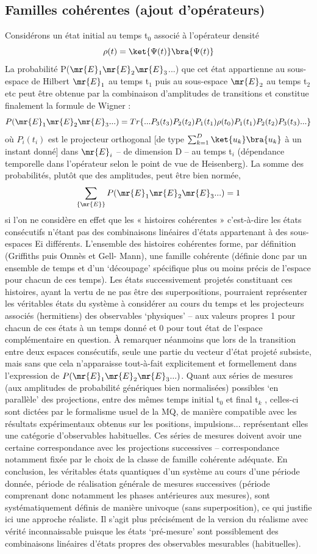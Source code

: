 \subsection{Familles cohérentes (ajout d’opérateurs)}
Considérons un état initial au temps t$_0$ associé à l’opérateur densité
\[
\rho(t)=\ket{\Psi(t)}\bra{\Psi(t)}
\]
La probabilité P($\mr{E}_1\mr{E}_2\mr{E}_3$...) que cet état appartienne au sous-espace de
Hilbert $\mr{E}_1$ au temps t$_1$ puis au sous-espace $\mr{E}_2$ au temps t$_2$ etc peut
être obtenue par la combinaison d’amplitudes de
transitions et constitue finalement la formule de Wigner :
\[
P(\mr{E}_1\mr{E}_2\mr{E}_3...)=
Tr\{...P_3(t_3)P_2(t_2)P_1(t_1)\rho(t_0)P_1(t_1)P_2(t_2)P_3(t_3)...\}
\]
où $P_i(t_i)$ est le projecteur orthogonal [de type $\sum_{k=1}^D\ket{u_k}\bra{u_k}$ à un
 instant donné] dans $\mr{E}_i$ –
de dimension D – au temps t$_i$ (dépendance temporelle dans l’opérateur selon le point de vue
de Heisenberg). La somme des probabilités, plutôt que des amplitudes, peut être bien
normée,
\[
\sum_{\{\mr{E}\}}P(\mr{E}_1\mr{E}_2\mr{E}_3...)=1
\]
si l’on ne considère en effet que les « histoires cohérentes » c’est-à-dire les états consécutifs
n’étant pas des combinaisons linéaires d’états appartenant à des sous-espaces Ei différents.
L’ensemble des histoires cohérentes forme, par définition (Griffiths puis Omnès et Gell-
Mann), une famille cohérente (définie donc par un ensemble de temps et d’un ‘découpage’
spécifique plus ou moins précis de l’espace pour chacun de ces temps). Les états
successivement projetés constituant ces histoires, ayant la vertu de ne pas être des
superpositions, pourraient représenter les véritables états du système à considérer au cours
du temps et les projecteurs associés (hermitiens) des observables ‘physiques’ – aux valeurs
propres 1 pour chacun de ces états à un temps donné et 0 pour tout état de l’espace
complémentaire en question. À remarquer néanmoins que lors de la transition entre deux
espaces consécutifs, seule une partie du vecteur d’état projeté subsiste, mais sans que cela
n’apparaisse tout-à-fait explicitement et formellement dans l’expression de
$P(\mr{E}_1\mr{E}_2\mr{E}_3...)$.
Quant aux séries de mesures (aux amplitudes de probabilité génériques bien normalisées)
possibles ‘en parallèle’ des projections, entre des mêmes temps initial t$_0$ et final t$_k$ , celles-ci
sont dictées par le formalisme usuel de la MQ, de manière compatible avec les résultats
expérimentaux obtenus sur les positions, impulsions... représentant elles une catégorie
d’observables habituelles. Ces séries de mesures doivent avoir une certaine correspondance
avec les projections successives – correspondance notamment fixée par le choix de la classe
de famille cohérente adéquate. En conclusion, les véritables états quantiques d’un système
au cours d’une période donnée, période de réalisation générale de mesures successives
(période comprenant donc notamment les phases antérieures aux mesures), sont
systématiquement définis de manière univoque (sans superposition), ce qui justifie ici une
approche réaliste. Il s’agit plus précisément de la version du réalisme avec vérité
inconnaissable puisque les états ‘pré-mesure’ sont possiblement des combinaisons linéaires
d’états propres des observables mesurables (habituelles).
